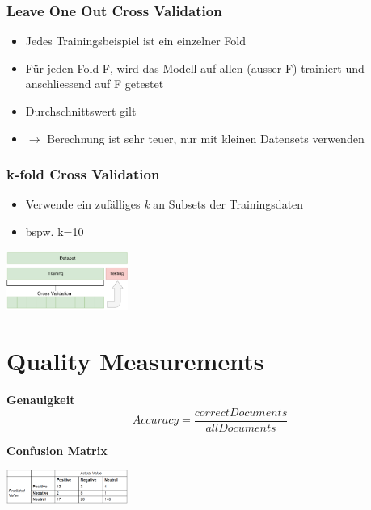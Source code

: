 \documentclass{article}
\newenvironment{Figure}
	{\par\medskip\noindent\minipage{\linewidth}}
	{\endminipage\par\medskip}
\theoremstyle{merke}
\theoremstyle{definition}
\begin{document}
		    \subsubsection{Leave One Out Cross Validation}
            \begin{itemize}
                \item Jedes Trainingsbeispiel ist ein einzelner Fold
                \item Für jeden Fold F, wird das Modell auf allen (ausser F) trainiert und anschliessend auf F getestet
                \item Durchschnittswert gilt 
                \item $\rightarrow$ Berechnung ist sehr teuer, nur mit kleinen Datensets verwenden
            \end{itemize}

            \subsubsection{k-fold Cross Validation}
            \begin{itemize}
                \item Verwende ein zufälliges \textit{k} an Subsets der Trainingsdaten
                \item bspw. k=10
            \end{itemize}
            \begin{Figure}
            \centering
            \includegraphics[width=150px]{img/Cross-kFoldCV.png}
                \label{fig:Schema k-Fold Cross Validation}
            \end{Figure}


    \section{Quality Measurements}
    \textbf{Genauigkeit}
    \begin{equation}
        Accuracy = \frac{correctDocuments}{allDocuments}
    \end{equation}

    \textbf{Confusion Matrix}
    \begin{Figure}
    \centering
    \includegraphics[width=150px]{img/ConfusionMatrix.png}
        \label{fig:Abbildung einer Confusion Matrix}
    \end{Figure}
\end{document}
